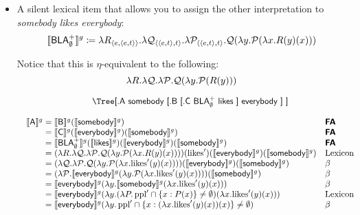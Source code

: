 \begin{itemize}
	\item A silent lexical item that allows you to assign the other interpretation to \emph{somebody likes everybody}:%
	\[\llbracket \textsf{BLA}_\emptyset^+ \rrbracket^g \coloneqq \lambda R_{\langle e,\langle e,t \rangle \rangle}.\lambda {\cal Q}_{\langle \langle e,t \rangle,t \rangle}.\lambda {\cal P}_{\langle \langle e,t \rangle,t \rangle}.{\cal Q}(\lambda y.{\cal P}(\lambda x.R(y)(x)))\] %
	
	Notice that this is $\eta$-equivalent to the following:
	\[\lambda R.\lambda {\cal Q}.\lambda {\cal P}.{\cal Q}(\lambda y.{\cal P}(R(y)))\] %
	
	\[\begin{array}{c}
		\begin{array}{c}
			\textsf{\Tree [.A somebody [.B [.C BLA$_\emptyset^+$ likes ] everybody ] ]}
		\end{array}
		\\\\
		\begin{array}{r@{}ll}
			\sv{\textsf{A}}^g &{}= \sv{\textsf{B}}^g(\sv{\textsf{somebody}}^g) & \bsf{FA}
			\\
			&{}= \sv{\textsf{C}}^g(\sv{\textsf{everybody}}^g)(\sv{\textsf{somebody}}^g) & \bsf{FA}%
			\\
			&{}= \sv{\textsf{BLA}_\emptyset^+}^g(\sv{\textsf{likes}}^g)(\sv{\textsf{everybody}}^g)(\sv{\textsf{somebody}}^g) & \bsf{FA}%
			\\
			&{}= (\lambda R.\lambda {\cal Q}.\lambda {\cal P}.{\cal Q}(\lambda y.{\cal P}(\lambda x.R(y)(x))))(\text{likes}')(\sv{\textsf{everybody}}^g)(\sv{\textsf{somebody}}^g) & \text{Lexicon}%
			\\
			&{}= (\lambda {\cal Q}.\lambda {\cal P}.{\cal Q}(\lambda y.{\cal P}(\lambda x.\text{likes}'(y)(x))))(\sv{\textsf{everybody}}^g)(\sv{\textsf{somebody}}^g) & \beta%
			\\
			&{}= (\lambda {\cal P}.\sv{\textsf{everybody}}^g(\lambda y.{\cal P}(\lambda x.\text{likes}'(y)(x))))(\sv{\textsf{somebody}}^g) & \beta%
			\\
			&{}= \sv{\textsf{everybody}}^g(\lambda y.\sv{\textsf{somebody}}^g(\lambda x.\text{likes}'(y)(x))) & \beta%
			\\
			&{}= \sv{\textsf{everybody}}^g(\lambda y.(\lambda P.\,\text{ppl}' \cap \{x : P(x)\} \neq \emptyset)(\lambda x.\text{likes}'(y)(x))) & \text{Lexicon}%
			\\
			&{}= \sv{\textsf{everybody}}^g(\lambda y.\,\text{ppl}' \cap \{x : (\lambda x.\text{likes}'(y)(x))(x)\} \neq \emptyset) & \beta%
			\\

\end{array}
\end{array}\]
\end{itemize}
